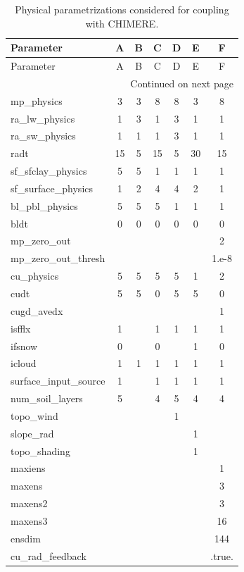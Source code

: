 \documentclass[
]{article}
\begin{document}
\begin{longtable}{@{}lcccccc@{}}
	
	\toprule
	Parameter & A & B & C & D & E & F \\
	\midrule
	\endfirsthead
	
	\toprule
	Parameter & A & B & C & D & E & F \\
	\midrule
	\endhead
	
	\midrule
	\multicolumn{7}{r}{Continued on next page} \\
	\endfoot
	
	\bottomrule
	\caption{Physical parametrizations considered for coupling with CHIMERE.}
	\label{tab:chimere_physics}
	\endlastfoot
	
	mp\_physics & 3 & 3 & 8 & 8 & 3 & 8 \\
	ra\_lw\_physics & 1 & 3 & 1 & 3 & 1 & 1 \\
	ra\_sw\_physics & 1 & 1 & 1 & 3 & 1 & 1 \\
	radt & 15 & 5 & 15 & 5 & 30 & 15 \\
	sf\_sfclay\_physics & 5 & 5 & 1 & 1 & 1 & 1 \\
	sf\_surface\_physics & 1 & 2 & 4 & 4 & 2 & 1 \\
	bl\_pbl\_physics & 5 & 5 & 5 & 1 & 1 & 1 \\
	bldt & 0 & 0 & 0 & 0 & 0 & 0 \\
	mp\_zero\_out & & & & & & 2 \\
	mp\_zero\_out\_thresh & & & & & & 1.e-8 \\
	cu\_physics & 5 & 5 & 5 & 5 & 1 & 2 \\
	cudt & 5 & 5 & 0 & 5 & 5 & 0 \\
	cugd\_avedx & & & & & & 1 \\
	isfflx & 1 & & 1 & 1 & 1 & 1 \\
	ifsnow & 0 & & 0 & & 1 & 0 \\
	icloud & 1 & 1 & 1 & 1 & 1 & 1 \\
	surface\_input\_source & 1 & & 1 & 1 & 1 & 1 \\
	num\_soil\_layers & 5 & & 4 & 5 & 4 & 4 \\
	topo\_wind & & & & 1 & & \\
	slope\_rad & & & & & 1 & \\
	topo\_shading & & & & & 1 & \\
	maxiens & & & & & & 1 \\
	maxens & & & & & & 3 \\
	maxens2 & & & & & & 3 \\
	maxens3 & & & & & & 16 \\
	ensdim & & & & & & 144 \\
	cu\_rad\_feedback & & & & & & .true. \\
	
\end{longtable}
\end{document}
